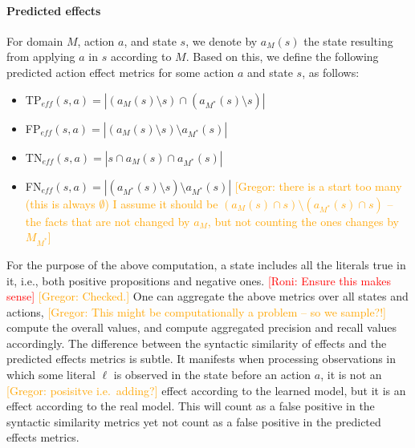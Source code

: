 \documentclass{article}
\theoremstyle{definition}
\theoremstyle{remark}
\newcommand{\realm}{\ensuremath{M^*}\xspace}
\newcommand{\eff}{\ensuremath{\textit{eff}}\xspace}
\newcommand{\roni}[1]{{\textcolor{red}{[Roni: #1]}}}
\newcommand{\yarin}[1]{{\textcolor{teal}{[Yarin: #1]}}}
\newcommand{\gregor}[1]{{\textcolor{orange}{[Gregor: #1]}}}
\begin{document}
\paragraph{Predicted effects}
For domain $M$, action $a$, and state $s$, we denote by $a_M(s)$ the state resulting from applying $a$ in $s$ according to $M$. 
Based on this, we define the following predicted action effect metrics for some action $a$ and state $s$, as follows: 
\begin{itemize}
    \item TP$_{\eff}(s,a)=|(a_M(s)\setminus s)\cap (a_\realm(s)\setminus s)|$
    \item FP$_{\eff}(s,a)=|(a_M(s)\setminus s)\setminus a_\realm(s)|$ 
    \item TN$_{\eff}(s,a)=|s \cap a_M(s) \cap a_\realm(s)|$
    \item FN$_{\eff}(s,a)=|(a_\realm(s)\setminus s)\setminus a_\realm(s)|$ \gregor{there is a start too many (this is always $\emptyset$) I assume it should be $(a_M(s)\cap s)\setminus (a_\realm(s) \cap s)$ -- the facts that are not changed by $a_M$, but not counting the ones changes by $M_\realm$}
\end{itemize}
For the purpose of the above computation, a state includes all the literals true in it, i.e., both positive propositions and negative ones. 
\roni{Ensure this makes sense} \gregor{Checked.}
One can aggregate the above metrics over all states and actions, \gregor{This might be computationally a problem -- so we sample?!}
compute the overall values, and compute aggregated precision and recall values accordingly.  
The difference between the syntactic similarity of effects and the predicted effects metrics is subtle. 
It manifests when processing observations in which some literal $\ell$ is observed in the state before an action $a$, 
it is not an \gregor{posisitve i.e.\ adding?} effect according to the learned model, but it is an effect according to the real model. 
This will count as a false positive in the syntactic similarity metrics yet not count as a false positive in the predicted effects metrics. 
\end{document}
